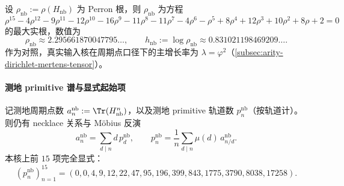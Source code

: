 \begin{corollary}[测地增长率与测地熵]\label{cor:real-input-40-geodesic-entropy}
设 \(\rho_{\mathrm{nb}}:=\rho(H_{\mathrm{nb}})\) 为 Perron 根，则 \(\rho_{\mathrm{nb}}\) 为方程
\[
\rho^{15}-4\rho^{12}-9\rho^{11}-12\rho^{10}-16\rho^{9}-11\rho^{8}-11\rho^{7}-4\rho^{6}-\rho^{5}+8\rho^{4}+12\rho^{3}+10\rho^{2}+8\rho+2=0
\]
的最大实根，数值为
\[
\rho_{\mathrm{nb}}\approx 2.295661870047795\ldots,\qquad
h_{\mathrm{nb}}:=\log\rho_{\mathrm{nb}}\approx 0.831021198469209\ldots.
\]
作为对照，真实输入核在周期点口径下的主增长率为 \(\lambda=\varphi^2\)（\ref{subsec:arity-dirichlet-mertens-tensor}）。
\end{corollary}

\paragraph{测地 primitive 谱与显式起始项}
记测地周期点数 \(a_n^{\mathrm{nb}}:=\Tr(H_{\mathrm{nb}}^n)\)，以及测地 primitive 轨道数 \(p_n^{\mathrm{nb}}\)（按轨道计）。
则仍有 necklace 关系与 Möbius 反演
\[
a_n^{\mathrm{nb}}=\sum_{d\mid n} d\,p_d^{\mathrm{nb}},
\qquad
p_n^{\mathrm{nb}}=\frac1n\sum_{d\mid n}\mu(d)\,a_{n/d}^{\mathrm{nb}}.
\]
本核上前 \(15\) 项完全显式：
\[
(p_n^{\mathrm{nb}})_{n=1}^{15}=(0,0,4,9,12,22,47,95,196,399,843,1775,3790,8038,17258).
\]


